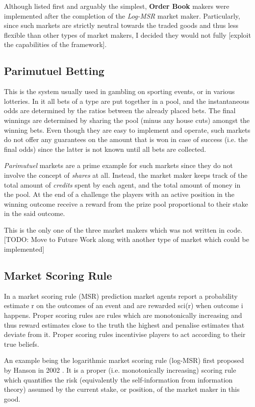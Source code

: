 \documentclass[bsc,frontabs,twoside,singlespacing,parskip,deptreport]{infthesis}     %
\begin{document}
\begin{itemize}
	Although listed first and arguably the simplest, {\bf Order Book} makers were implemented after the completion of the {\em Log-MSR} market maker. Particularly, since such markets are strictly neutral towards the traded goods and thus less flexible than other types of market makers, I decided they would not fully [exploit the capabilities of the framework]. 

    
\subsection{Parimutuel Betting}
This is the system usually used in gambling on sporting events, or in various lotteries. In it all bets of a type are put together in a pool, and the instantaneous odds are determined by the ratios between the already placed bets. The final winnings are determined by sharing the pool (minus any house cuts) amongst the winning bets. Even though they are easy to implement and operate, such markets do not offer any guarantees on the amount that is won in case of success (i.e. the final odds) since the latter is not known until all bets are collected.

{\em Parimutuel} markets are a prime example for such markets since they do not involve the concept of {\it shares} at all. Instead, the market maker keeps track of the total amount of {\it credits} spent by each agent, and the total amount of money in the pool. At the end of a challenge the players with an active position in the winning outcome receive a reward from the prize pool proportional to their stake in the said outcome. 

This is the only one of the three market makers which was not written in code. 
[TODO: Move to Future Work along with another type of market which could be implemented]

\subsection{Market Scoring Rule}

In a market scoring rule (MSR) prediction market agents report a probability estimate r on the outcomes of an event and are rewarded sci(r) when outcome i happens. Proper scoring rules are rules which are monotonically increasing and thus reward estimates close to the truth the highest and penalise estimates that deviate from it. Proper scoring rules incentivise players to act according to their true beliefs.

	An example being the logarithmic market scoring rule (log-MSR) first proposed by Hanson in 2002 \cite{hanson_logarithmic_2002}. It is a proper (i.e. monotonically increasing) scoring rule which quantifies the risk (equivalently the self-information from information theory) assumed by the current stake, or position, of the market maker in this good. 


\end{itemize}
\end{document}
